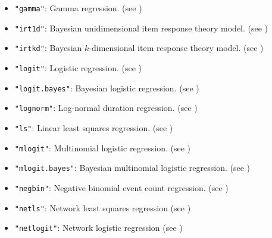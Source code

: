\begin{itemize}
\begin{itemize}
    \item {\tt "gamma"}: Gamma regression.  (see
      )
    \item {\tt "irt1d"}: Bayesian unidimensional item response theory model.
(see )
    \item {\tt "irtkd"}: Bayesian $k$-dimensional item response theory
model.  (see )
    \item {\tt "logit"}: Logistic regression.  (see
      )
    \item {\tt "logit.bayes"}: Bayesian logistic regression.  (see
)
    \item {\tt "lognorm"}: Log-normal duration regression.  (see
      )
    \item {\tt "ls"}: Linear least squares regression.  (see
      )
    \item {\tt "mlogit"}: Multinomial logistic regression.  (see
      )
    \item {\tt "mlogit.bayes"}: Bayesian multinomial logistic
regression.  (see )
    \item {\tt "negbin"}: Negative binomial event count regression.
      (see )
    \item {\tt "netls"}: Network least squares regression (see
)
\item {\tt "netlogit"}: Network logistic regression (see
)


\end{itemize}
\end{itemize}
